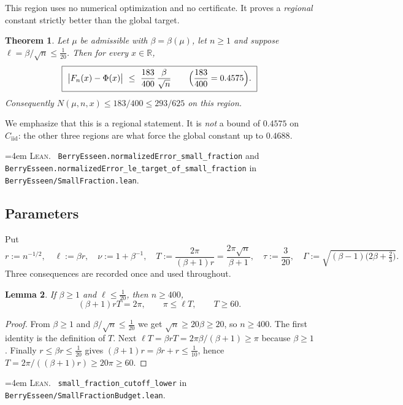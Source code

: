 \documentclass[10pt,a4paper]{article}
\theoremstyle{plain}
\newtheorem{theorem}{Theorem}[section]
\newtheorem{lemma}[theorem]{Lemma}
\theoremstyle{definition}
\newcommand{\R}{\mathbb{R}}
\newcommand{\Cii}{C_{\mathrm{iid}}}
\newcommand{\lean}[1]{\texttt{#1}}
\newcommand{\file}[1]{\texttt{#1}}
\newenvironment{leanref}%
  {\par\addvspace{3pt}\begingroup\sloppy\emergencystretch=4em
   \noindent\footnotesize\textsc{Lean.}\ \ignorespaces}%
  {\par\endgroup\addvspace{3pt}}
\begin{document}
This region uses no numerical optimization and no certificate. It proves a
\emph{regional} constant strictly better than the global target.

\begin{theorem}\label{thm:small}
Let $\mu$ be admissible with $\beta=\beta(\mu)$, let $n\ge1$ and suppose
$\ell=\beta/\sqrt n\le\tfrac1{20}$. Then for every $x\in\R$,
\[
  \boxed{\ \bigl|F_n(x)-\Phi(x)\bigr| \ \le\ \frac{183}{400}\,\frac{\beta}{\sqrt n}
  \qquad\Bigl(\frac{183}{400}=0.4575\Bigr).\ }
\]
Consequently $N(\mu,n,x)\le183/400\le293/625$ on this region.
\end{theorem}

We emphasize that this is a regional statement. It is \emph{not} a bound of
$0.4575$ on $\Cii$: the other three regions are what force the global
constant up to $0.4688$.

\begin{leanref}
\lean{BerryEsseen.normalizedError\_small\_fraction} and
\lean{BerryEsseen.normalizedError\_le\_target\_of\_small\_fraction} in
\file{BerryEsseen/SmallFraction.lean}.
\end{leanref}

\subsection{Parameters}

Put
\[
  r := n^{-1/2},\quad \ell := \beta r,\quad
  \nu := 1+\beta^{-1},\quad
  T := \frac{2\pi}{(\beta+1)r} = \frac{2\pi\sqrt n}{\beta+1},\quad
  \tau := \frac{3}{20},\quad
  \Gamma := \sqrt{(\beta-1)\bigl(2\beta+\tfrac23\bigr)} .
\]
Three consequences are recorded once and used throughout.

\begin{lemma}\label{lem:small-params}
If $\beta\ge1$ and $\ell\le\tfrac1{20}$, then $n\ge400$,
\[
  (\beta+1)rT = 2\pi, \qquad \pi\le\ell T, \qquad T\ge60 .
\]
\end{lemma}

\begin{proof}
From $\beta\ge1$ and $\beta/\sqrt n\le\tfrac1{20}$ we get $\sqrt n\ge20\beta\ge20$,
so $n\ge400$. The first identity is the definition of $T$. Next
$\ell T=\beta rT=2\pi\beta/(\beta+1)\ge\pi$ because $\beta\ge1$. Finally
$r\le\beta r\le\tfrac1{20}$ gives $(\beta+1)r=\beta r+r\le\tfrac1{10}$, hence
$T=2\pi/((\beta+1)r)\ge20\pi\ge60$.
\end{proof}

\begin{leanref}
\lean{small\_fraction\_cutoff\_lower} in
\file{BerryEsseen/SmallFractionBudget.lean}.
\end{leanref}
\end{document}
